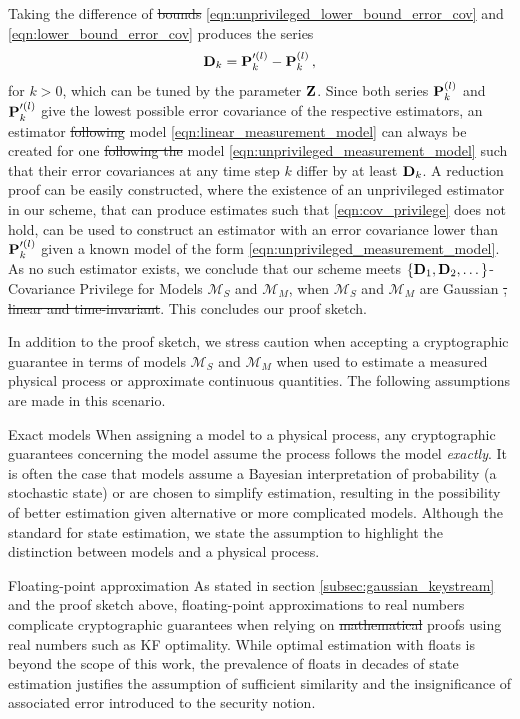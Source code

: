 \documentclass[letterpaper, 10 pt, conference]{ieeeconf}
\providecommand{\DIFadd}[1]{{\protect\color{blue}\uwave{#1}}} %
\providecommand{\DIFdel}[1]{{\protect\color{red}\sout{#1}}}                      %
\providecommand{\DIFaddbegin}{} %
\providecommand{\DIFaddend}{} %
\providecommand{\DIFdelbegin}{} %
\providecommand{\DIFdelend}{} %
\newcommand{\DIFscaledelfig}{0.5}
\newlength{\DIFdelgraphicswidth} %
\newlength{\DIFdelgraphicsheight} %
\newcommand{\DIFaddincludegraphics}[2][]{{\color{blue}\fbox{\DIFOincludegraphics[#1]{#2}}}} %
\newcommand{\DIFdelincludegraphics}[2][]{%
\sbox{\DIFdelgraphicsbox}{\DIFOincludegraphics[#1]{#2}}%
\settoboxwidth{\DIFdelgraphicswidth}{\DIFdelgraphicsbox} %
\settoboxtotalheight{\DIFdelgraphicsheight}{\DIFdelgraphicsbox} %
\scalebox{\DIFscaledelfig}{%
\parbox[b]{\DIFdelgraphicswidth}{\usebox{\DIFdelgraphicsbox}\\[-\baselineskip] \rule{\DIFdelgraphicswidth}{0em}}\llap{\resizebox{\DIFdelgraphicswidth}{\DIFdelgraphicsheight}{%
\setlength{\unitlength}{\DIFdelgraphicswidth}%
\begin{picture}(1,1)%
\thicklines\linethickness{2pt} %
{\color[rgb]{1,0,0}\put(0,0){\framebox(1,1){}}}%
{\color[rgb]{1,0,0}\put(0,0){\line( 1,1){1}}}%
{\color[rgb]{1,0,0}\put(0,1){\line(1,-1){1}}}%
\end{picture}%
}\hspace*{3pt}}} %
} %
\DeclareRobustCommand{\DIFaddbegin}{\DIFOaddbegin \let\includegraphics\DIFaddincludegraphics} %
\DeclareRobustCommand{\DIFaddend}{\DIFOaddend \let\includegraphics\DIFOincludegraphics} %
\DeclareRobustCommand{\DIFdelbegin}{\DIFOdelbegin \let\includegraphics\DIFdelincludegraphics} %
\DeclareRobustCommand{\DIFdelend}{\DIFOaddend \let\includegraphics\DIFOincludegraphics} %
\begin{document}
Taking the difference of \DIFdelbegin \DIFdel{bounds }\DIFdelend \eqref{eqn:unprivileged_lower_bound_error_cov} and \eqref{eqn:lower_bound_error_cov} produces the series
\begin{equation}\label{eqn:covariance_difference_series}
   {\ensuremath{{\mathbf{D}}}}_k = {{\mathbf{P}}}_k^{\prime(l)} - {{\mathbf{P}}}_k^{(l)}\,,
\end{equation}
for $k>0$, which can be tuned by the parameter ${{\mathbf{Z}}}$. Since both series ${{\mathbf{P}}}_k^{(l)}$ and ${{\mathbf{P}}}_k^{\prime(l)}$ give the lowest possible error covariance of the respective estimators, an estimator \DIFdelbegin \DIFdel{following }\DIFdelend \DIFaddbegin \DIFadd{knowing }\DIFaddend model \eqref{eqn:linear_measurement_model} can always be created for one \DIFdelbegin \DIFdel{following the }\DIFdelend \DIFaddbegin \DIFadd{knowing only }\DIFaddend model \eqref{eqn:unprivileged_measurement_model} such that their error covariances at any time step $k$ differ by at least ${{\mathbf{D}}}_k$. A reduction proof can be easily constructed, where the existence of an unprivileged estimator in our scheme, that can produce estimates such that \eqref{eqn:cov_privilege} does not hold, can be used to construct an estimator with an error covariance lower than ${{\mathbf{P}}}_k^{\prime(l)}$ given a known model of the form \eqref{eqn:unprivileged_measurement_model}. As no such estimator exists, we conclude that our scheme meets $\{{{\mathbf{D}}}_1,{{\mathbf{D}}}_2,\dots\}$-Covariance Privilege for Models $\mathcal{M}_S$ and $\mathcal{M}_M$, when $\mathcal{M}_S$ and $\mathcal{M}_M$ are Gaussian \DIFdelbegin \DIFdel{, linear and time-invariant}\DIFdelend \DIFaddbegin \DIFadd{and linear}\DIFaddend . This concludes our proof sketch.

In addition to the proof sketch, we stress caution when accepting a cryptographic guarantee in terms of models $\mathcal{M}_S$ and $\mathcal{M}_M$ when used to estimate a measured physical process or approximate continuous quantities. The following assumptions are made in this scenario.
\begin{LaTeXdescription}
   \item[Exact models] When assigning a model to a physical process, any cryptographic guarantees concerning the model assume the process follows the model \textit{exactly}. It is often the case that models assume a Bayesian interpretation of probability (a stochastic state) or are chosen to simplify estimation, resulting in the possibility of better estimation given alternative or more complicated models. Although the standard for state estimation, we state the assumption to highlight the distinction between models and a physical process.
   \item[Floating-point approximation] As stated in section \ref{subsec:gaussian_keystream} and the proof sketch above, floating-point approximations to real numbers complicate cryptographic guarantees when relying on \DIFdelbegin \DIFdel{mathematical }\DIFdelend proofs using real numbers such as KF optimality. While optimal estimation with floats is beyond the scope of this work, the prevalence of floats in decades of state estimation justifies the assumption of sufficient similarity and the insignificance of associated error introduced to the security notion.
\end{LaTeXdescription}
\end{document}
